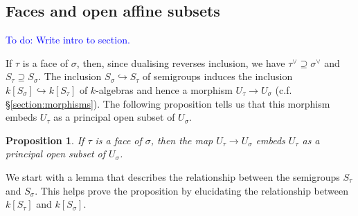 \documentclass[12pt]{amsart}
\newcommand{\todo}[1]{\noindent  \textcolor{blue}{To do: #1}}
\theoremstyle{plain}
\newtheorem{proposition}[theorem]{Proposition}
\begin{document}
\subsection{Faces and open affine subsets}\label{section:facesandopenaffinesubsets}
\todo{Write intro to section.}

If $\tau$ is a face of $\sigma$, then, since dualising reverses inclusion, we have $\tau^\vee \supseteq \sigma^\vee$ and $S_\tau \supseteq S_\sigma$.
The inclusion $S_\sigma \hookrightarrow S_\tau$ of semigroups induces the inclusion $k[S_\sigma] \hookrightarrow k[S_\tau]$ of $k$-algebras and hence a morphism $U_\tau \to U_\sigma$ (c.f. \S \ref{section:morphisms}).
The following proposition tells us that this morphism embeds $U_\tau$ as a principal open subset of $U_\sigma$.

\begin{proposition}\label{proposition:facesopensubsets}
If $\tau$ is a face of $\sigma$, then the map $U_\tau \to U_\sigma$ embeds $U_\tau$ as a principal open subset of $U_\sigma$.
\end{proposition}

We start with a lemma that describes the relationship between the semigroups $S_\tau$ and $S_\sigma$.
This helps prove the proposition by elucidating the relationship between $k[S_\tau]$ and $k[S_\sigma]$.
\end{document}
